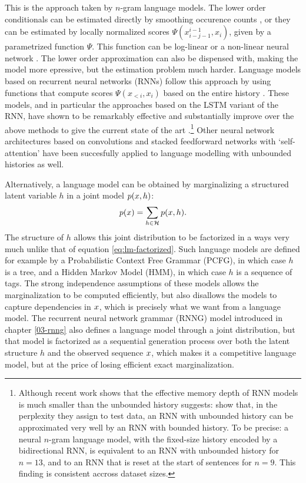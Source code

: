     This is the approach taken by $n$-gram language models. The lower order conditionals can be estimated directly by smoothing occurence counts \citep{chen1999empirical,kneser1995improved}, or they can be estimated by locally normalized scores $\Psi(x_{i-j-1}^{i-1}, x_i)$, given by a parametrized function $\Psi$. This function can be log-linear or a non-linear neural network \citep{rosenfeld1996loglinear,bengio2003neural}. The lower order approximation can also be dispensed with, making the model more epressive, but the estimation problem much harder. Language models based on recurrent neural networks (RNNs) follow this approach by using functions that compute scores $\Psi(x_{<i}, x_i)$ based on the entire history \citep{mikolov2010recurrent}. These models, and in particular the approaches based on the LSTM variant of the RNN, have shown to be remarkably effective and substantially improve over the above methods to give the current state of the art \citep{zaremba2014recurrent,jozefowicz2016exploring}.\footnote{Although recent work shows that the effective memory depth of RNN models is much smaller than the unbounded history suggests: \citet{chelba2017n} show that, in the perplexity they assign to test data, an RNN with unbounded history can be approximated very well by an RNN with bounded history. To be precise: a neural $n$-gram language model, with the fixed-size history encoded by a bidirectional RNN, is equivalent to an RNN with unbounded history for $n=13$, and to an RNN that is reset at the start of sentences for $n=9$. This finding is consistent accross dataset sizes.} Other neural network architectures based on convolutions \citep{kalchbrenner2014convolutional} and stacked feedforward networks with `self-attention' \citep{vaswani2017attention} have been succesfully applied to language modelling with unbounded histories as well.

    Alternatively, a language model can be obtained by marginalizing a structured latent variable $h$ in a joint model $p(x, h)$:
    \begin{align}
      \label{eq:lm-latent}
      p( x ) = \sum_{h \in \mathcal{H}} p(x, h).
    \end{align}
    The structure of $h$ allows this joint distribution to be factorized in a ways very much unlike that of equation \ref{eq:lm-factorized}. Such language models are defined for example by a Probabilistic Context Free Grammar (PCFG), in which case $h$ is a tree, and a Hidden Markov Model (HMM), in which case $h$ is a sequence of tags. The strong independence assumptions of these models allows the marginalization to be computed efficiently, but also disallows the models to capture dependencies in $x$, which is precisely what we want from a language model. The recurrent neural network grammar (RNNG) model introduced in chapter \ref{03-rnng} also defines a language model through a joint distribution, but that model is factorized as a sequential generation process over both the latent structure $h$ and the observed sequence $x$, which makes it a competitive language model, but at the price of losing efficient exact marginalization.


